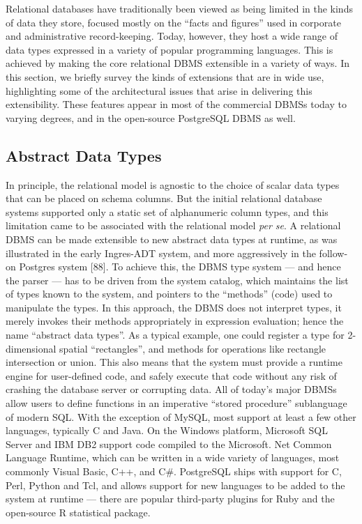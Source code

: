 \documentclass[a4paper,11pt,twoside,openright]{book}
\begin{document}
Relational databases have traditionally been viewed as being limited in
the kinds of data they store, focused mostly on the ``facts and
figures'' used in corporate and administrative record-keeping. Today,
however, they host a wide range of data types expressed in a variety of
popular programming languages. This is achieved by making the core
relational DBMS extensible in a variety of ways. In this section, we
briefly survey the kinds of extensions that are in wide use,
highlighting some of the architectural issues that arise in delivering
this extensibility. These features appear in most of the commercial
DBMSs today to varying degrees, and in the open-source PostgreSQL DBMS
as well.

\hypertarget{abstract-data-types}{%
\subsection{Abstract Data Types}\label{abstract-data-types}}

In principle, the relational model is agnostic to the choice of scalar
data types that can be placed on schema columns. But the initial
relational database systems supported only a static set of alphanumeric
column types, and this limitation came to be associated with the
relational model \emph{per se}. A relational DBMS can be made extensible
to new abstract data types at runtime, as was illustrated in the early
Ingres-ADT system, and more aggressively in the follow-on Postgres
system {[}88{]}.
  To achieve this, the DBMS type system --- and hence the parser --- has
  to be driven from the system catalog, which maintains the list of
  types known to the system, and pointers to the ``methods'' (code) used
  to manipulate the types. In this approach, the DBMS does not interpret
  types, it merely invokes their methods appropriately in expression
  evaluation; hence the name ``abstract data types''. As a typical
  example, one could register a type for 2-dimensional spatial
  ``rectangles'', and methods for operations like rectangle intersection
  or union. This also means that the system must provide a runtime
  engine for user-defined code, and safely execute that code without any
  risk of crashing the database server or corrupting data. All of
  today's major DBMSs allow users to define functions in an imperative
  ``stored procedure'' sublanguage of modern SQL. With the exception of
  MySQL, most support at least a few other languages, typically C and
  Java. On the Windows platform, Microsoft SQL Server and IBM DB2
  support code compiled to the Microsoft. Net Common Language Runtime,
  which can be written in a wide variety of languages, most commonly
  Visual Basic, C++, and C\#. PostgreSQL ships with support for C, Perl,
  Python and Tcl, and allows support for new languages to be added to
  the system at runtime --- there are popular third-party plugins for
  Ruby and the open-source R statistical package.
\end{document}
